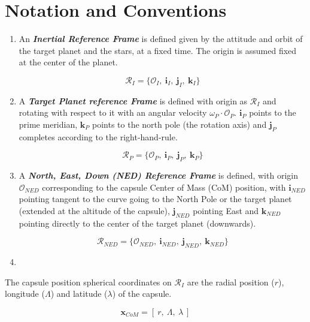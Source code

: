 \newpage
\chapter{Notation and Conventions}

   \begin{enumerate}
      \item An \textbf{\textit{Inertial Reference Frame}} is defined given by the attitude and orbit of the target planet
         and the stars, at a fixed time.
         The origin is assumed fixed at the center of the planet.

         $$\mathcal{R}_{I}=\{ \mathcal{O}_{I},\: \textbf{i}_{I},\:\textbf{j}_I,\: \textbf{k}_I \}$$

      \item A \textbf{\textit{Target Planet reference Frame}} is defined with 
         origin as $\mathcal{R}_{I}$ and rotating with respect to it with an angular
         velocity $\omega_{P}\cdot \mathcal{O}_{P}$.
         $\textbf{i}_{P}$ points to the prime meridian, $\textbf{k}_{P}$ points to the
         north pole (the rotation axis) and $\textbf{j}_{P}$ completes according
         to the right-hand-rule.

         $$\mathcal{R}_{P}=\{ \mathcal{O}_{P},\: \textbf{i}_{P},\:\textbf{j}_P,\: \textbf{k}_P \}$$

      \item A \textbf{\textit{North, East, Down (NED) Reference Frame}} is defined, with origin $\mathcal{O}_{NED}$
         corresponding to the capsule Center of Mass (CoM) position, with $\textbf{i}_{NED}$
         pointing tangent to the curve going to the North Pole or the target planet (extended at
         the altitude of the capsule), $\textbf{j}_{NED}$ pointing East and $\textbf{k}_{NED}$
         pointing directly to the center of the target planet (downwards).

         $$\mathcal{R}_{NED}=\{ \mathcal{O}_{NED},\: \textbf{i}_{NED},\:\textbf{j}_{NED},\: \textbf{k}_{NED} \}$$

      \item

   \end{enumerate}

   The capsule position spherical coordinates on $\mathcal{R}_{I}$ are the radial position
   ($r$), longitude ($\Lambda$) and latitude ($\lambda$) of the capsule.

   $$
      \textbf{x}_{CoM} = [\: r,\:\Lambda,\:\lambda \:]
   $$


